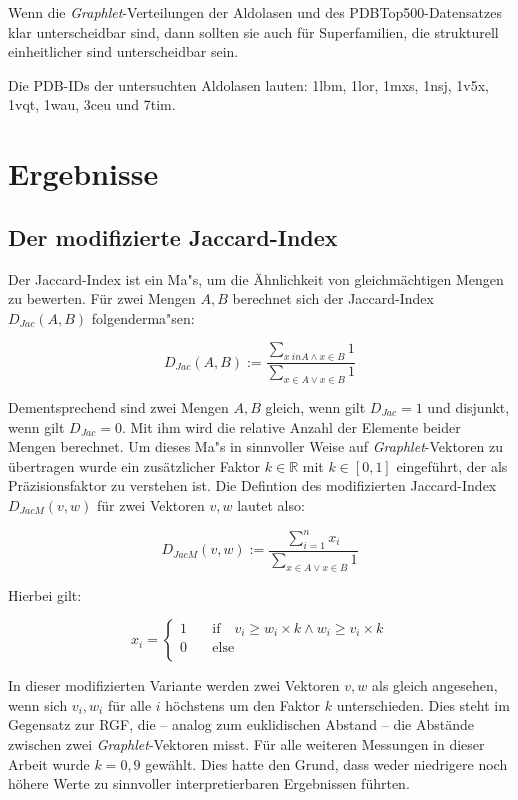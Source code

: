 \documentclass{report}
\begin{document}
Wenn die \textit{Graphlet}-Verteilungen der Aldolasen und des PDBTop500-Datensatzes klar unterscheidbar sind, dann sollten sie auch f\"ur Superfamilien, die strukturell einheitlicher sind unterscheidbar sein.

Die PDB-IDs der untersuchten Aldolasen lauten: 1lbm, 1lor, 1mxs, 1nsj, 1v5x, 1vqt, 1wau, 3ceu und 7tim.



\chapter{Ergebnisse}

\section{Der modifizierte Jaccard-Index}


Der Jaccard-Index ist ein Ma"s, um die \"Ahnlichkeit von gleichm\"achtigen Mengen zu bewerten. F\"ur zwei Mengen $A,B$ berechnet sich der Jaccard-Index $D_{Jac}(A,B)$ folgenderma"sen:

\[ D_{Jac}(A,B) := \frac{\sum_{x \ in A \land x \in B} 1}{\sum_{x \in A \lor x \in B} 1} \]

Dementsprechend sind zwei Mengen $A,B$ gleich, wenn  gilt $D_{Jac} = 1$ und disjunkt, wenn gilt $D_{Jac} = 0$. Mit ihm wird die relative Anzahl der Elemente beider Mengen berechnet.
Um dieses Ma"s in sinnvoller Weise auf \textit{Graphlet}-Vektoren zu \"ubertragen wurde ein zus\"atzlicher Faktor $k \in \mathbb{R} $ mit $k \in [0,1]$  eingef\"uhrt, der als Pr\"azisionsfaktor zu verstehen ist. Die Defintion des modifizierten Jaccard-Index $D_{JacM}(v,w)$ f\"ur zwei Vektoren $v,w$ lautet also:

\[ D_{JacM}(v,w) := \frac{\sum_{i = 1}^n x_i}{\sum_{x \in A \lor x \in B} 1} \]

Hierbei gilt:

\[ x_i = 
   \begin{cases}
     1     & \quad \mathrm{if} \quad v_i \geq w_i \times k \land w_i \geq v_i \times k \\
     0     & \quad \mathrm{else} \\
   \end{cases}
\]

In dieser modifizierten Variante werden zwei Vektoren $v,w$ als gleich angesehen, wenn sich $v_i,w_i$ f\"ur alle $i$ h\"ochstens um den Faktor $k$ unterschieden.
Dies steht im Gegensatz zur RGF, die -- analog zum euklidischen Abstand -- die Abst\"ande zwischen zwei \textit{Graphlet}-Vektoren misst.
F\"ur alle weiteren Messungen in dieser Arbeit wurde $k=0,9$ gew\"ahlt. Dies hatte den Grund, dass weder niedrigere noch h\"ohere Werte zu sinnvoller interpretierbaren Ergebnissen f\"uhrten.
\end{document}
